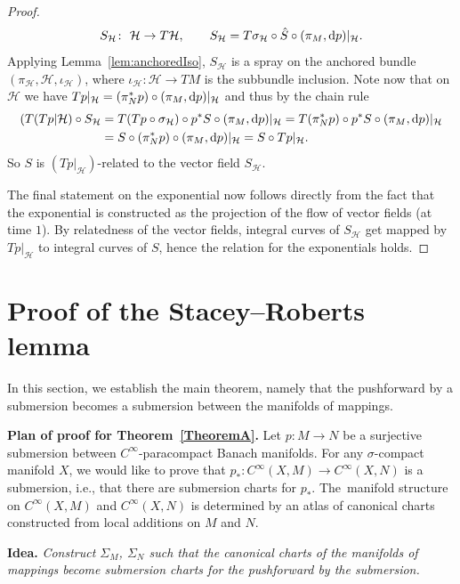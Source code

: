 \documentclass[11pt]{article}
\numberwithin{equation}{section}
\numberwithin{equation}{section}
\newtheorem{setup}[Theorem]{}
\newcommand{\cH}{\ensuremath{\mathcal{H}}}
\begin{document}
\begin{proof}
\begin{displaymath}
 S_\cH \colon \ \cH \rightarrow T\cH,\qquad S_\cH = T\sigma_\cH \circ \hat{S} \circ (\pi_M, {\rm d}p)|_{\cH}.\end{displaymath}
Applying Lemma~\ref{lem:anchoredIso}, $S_{\cH}$ is a spray on the anchored bundle $(\pi_{\cH}, \cH, \iota_\cH)$, where $\iota_\cH \colon \cH \rightarrow TM$ is the subbundle inclusion.
Note now that on $\cH$ we have $Tp|_\cH = (\pi_N^\ast p) \circ (\pi_M,{\rm d}p)|_\cH$ and thus by the chain rule
\begin{align*}
(T(Tp|\cH) \circ S_\cH &= T(Tp \circ \sigma_\cH) \circ p^\ast S\circ (\pi_M, {\rm d}p)|_{\cH} = T(\pi_N^\ast p) \circ p^\ast S \circ (\pi_M, {\rm d}p)|_{\cH} \\
&= S \circ (\pi_N^\ast p) \circ (\pi_M, {\rm d}p)|_{\cH} = S \circ Tp|_{\cH}.
\end{align*}
So $S$ is $(Tp|_{\cH})$-related to the vector field $S_\cH$.

The final statement on the exponential now follows directly from the fact that the exponential is constructed as the projection of the flow of vector fields (at time $1$). By relatedness of the vector fields, integral curves of $S_\cH$ get mapped by $Tp|_{\cH}$ to integral curves of $S$, hence the relation for the exponentials holds.
\end{proof}

\section{Proof of the Stacey--Roberts lemma}

In this section, we establish the main theorem, namely that the pushforward by a submersion becomes a submersion between the manifolds of mappings.

{\bf Plan of proof for Theorem~\ref{TheoremA}.}\label{plan_of_attack}
Let $p \colon M \rightarrow N$ be a surjective submersion between $C^\infty$-paracompact Banach manifolds. For any $\sigma$-compact manifold $X$, we would like to prove that $p_\ast \colon C^\infty (X,M) \rightarrow C^\infty (X,N)$ is a submersion, i.e., that there are submersion charts for $p_\ast$.
The~manifold structure on $C^\infty (X,M)$ and $C^\infty (X,N)$ is determined by an atlas of canonical charts constructed from local additions on $M$ and $N$.

{\bf Idea.} \emph{Construct $\Sigma_M$, $\Sigma_N$ such that the canonical charts of the manifolds of mappings become submersion charts for the pushforward by the submersion.}
\end{document}
